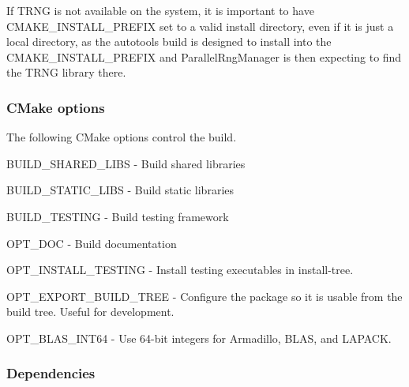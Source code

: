 If T\+R\+NG is not available on the system, it is important to have {\ttfamily C\+M\+A\+K\+E\+\_\+\+I\+N\+S\+T\+A\+L\+L\+\_\+\+P\+R\+E\+F\+IX} set to a valid install directory, even if it is just a local directory, as the autotools build is designed to install into the {\ttfamily C\+M\+A\+K\+E\+\_\+\+I\+N\+S\+T\+A\+L\+L\+\_\+\+P\+R\+E\+F\+IX} and Parallel\+Rng\+Manager is then expecting to find the T\+R\+NG library there.

\subsubsection*{C\+Make options}

The following C\+Make options control the build.
\begin{DoxyItemize}
\item {\ttfamily B\+U\+I\+L\+D\+\_\+\+S\+H\+A\+R\+E\+D\+\_\+\+L\+I\+BS} -\/ Build shared libraries
\item {\ttfamily B\+U\+I\+L\+D\+\_\+\+S\+T\+A\+T\+I\+C\+\_\+\+L\+I\+BS} -\/ Build static libraries
\item {\ttfamily B\+U\+I\+L\+D\+\_\+\+T\+E\+S\+T\+I\+NG} -\/ Build testing framework
\item {\ttfamily O\+P\+T\+\_\+\+D\+OC} -\/ Build documentation
\item {\ttfamily O\+P\+T\+\_\+\+I\+N\+S\+T\+A\+L\+L\+\_\+\+T\+E\+S\+T\+I\+NG} -\/ Install testing executables in install-\/tree.
\item {\ttfamily O\+P\+T\+\_\+\+E\+X\+P\+O\+R\+T\+\_\+\+B\+U\+I\+L\+D\+\_\+\+T\+R\+EE} -\/ Configure the package so it is usable from the build tree. Useful for development.
\item {\ttfamily O\+P\+T\+\_\+\+B\+L\+A\+S\+\_\+\+I\+N\+T64} -\/ Use 64-\/bit integers for Armadillo, B\+L\+AS, and L\+A\+P\+A\+CK.
\end{DoxyItemize}

\subsubsection*{Dependencies}

